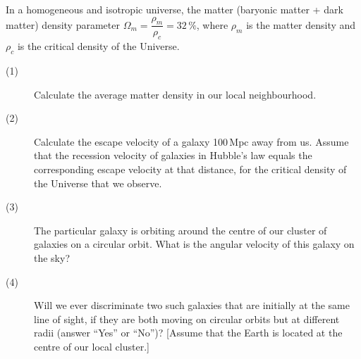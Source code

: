 In a homogeneous and isotropic universe, the matter (baryonic matter + dark
matter) density parameter
$\Omega_m = \dfrac{\rho_m}{\rho_c} = 32\,\%$, where $\rho_m$ is the matter
density and $\rho_c$ is the critical density of the Universe.

\begin{description}
\item[(1)] Calculate the average matter density in our local neighbourhood.
\item[(2)] Calculate the escape velocity of a galaxy 100\,Mpc away from us.
  Assume that the recession velocity of galaxies in Hubble's law equals the
  corresponding escape velocity at that distance, for the critical density of
  the Universe that we observe.
\item[(3)] The particular galaxy is orbiting around the centre of our cluster
  of galaxies on a circular orbit. What is the angular velocity of this galaxy
  on the sky?
\item[(4)] Will we ever discriminate two such galaxies that are initially at
  the same line of sight, if they are both moving on circular orbits but at
  different radii (answer ``Yes'' or ``No'')? [Assume that the Earth is
  located at the centre of our local cluster.]
\end{description}
